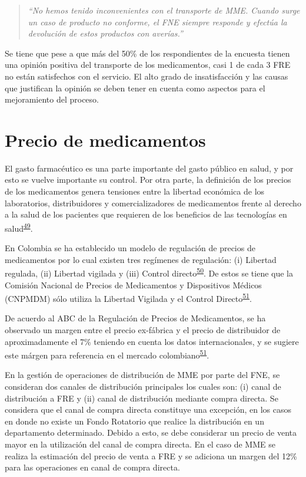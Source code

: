 \documentclass[
  oneside]{book}
\begin{document}
\begin{quote}
\emph{``No hemos tenido inconvenientes con el transporte de MME. Cuando surge un caso de producto no conforme, el FNE siempre responde y efectúa la devolución de estos productos con averías.''}
\end{quote}

Se tiene que pese a que más del 50\% de los respondientes de la encuesta tienen una opinión positiva del transporte de los medicamentos, casi 1 de cada 3 FRE no están satisfechos con el servicio. El alto grado de insatisfacción y las causas que justifican la opinión se deben tener en cuenta como aspectos para el mejoramiento del proceso.

\hypertarget{precioMedicamentos}{%
\section{Precio de medicamentos}\label{precioMedicamentos}}


El gasto farmacéutico es una parte importante del gasto público en salud, y por esto se vuelve importante su control. Por otra parte, la definición de los precios de los medicamentos genera tensiones entre la libertad económica de los laboratorios, distribuidores y comercializadores de medicamentos frente al derecho a la salud de los pacientes que requieren de los beneficios de las tecnologías en salud\textsuperscript{\protect\hyperlink{ref-AvilaRoncancio2019}{49}}.

En Colombia se ha establecido un modelo de regulación de precios de medicamentos por lo cual existen tres regímenes de regulación: (i) Libertad regulada, (ii) Libertad vigilada y (iii) Control directo\textsuperscript{\protect\hyperlink{ref-CongresodelaRepublicadeColombia1988}{50}}. De estos se tiene que la Comisión Nacional de Precios de Medicamentos y Dispositivos Médicos (CNPMDM) sólo utiliza la Libertad Vigilada y el Control Directo\textsuperscript{\protect\hyperlink{ref-SecretariaTecnicaCNPDM-2019}{51}}.

De acuerdo al ABC de la Regulación de Precios de Medicamentos, se ha observado un margen entre el precio ex-fábrica y el precio de distribuidor de aproximadamente el 7\% teniendo en cuenta los datos internacionales, y se sugiere este márgen para referencia en el mercado colombiano\textsuperscript{\protect\hyperlink{ref-SecretariaTecnicaCNPDM-2019}{51}}.

En la gestión de operaciones de distribución de MME por parte del FNE, se consideran dos canales de distribución principales los cuales son: (i) canal de distribución a FRE y (ii) canal de distribución mediante compra directa. Se considera que el canal de compra directa constituye una excepción, en los casos en donde no existe un Fondo Rotatorio que realice la distribución en un departamento determinado. Debido a esto, se debe considerar un precio de venta mayor en la utilización del canal de compra directa. En el caso de MME se realiza la estimación del precio de venta a FRE y se adiciona un margen del 12\% para las operaciones en canal de compra directa.
\end{document}
